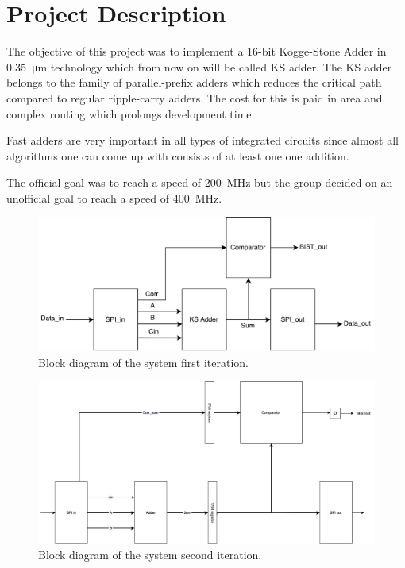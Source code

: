 \section{Project Description} \label{sec:project_description}
The objective of this project was to implement a 16-bit Kogge-Stone Adder in \SI{0.35}{\micro\m} technology which from now on will be called KS adder. The KS adder belongs to the family of parallel-prefix adders which reduces the critical path compared to regular ripple-carry adders. The cost for this is paid in area and complex routing which prolongs development time.

Fast adders are very important in all types of integrated circuits since almost all algorithms one can come up with consists of at least one one addition. 

The official goal was to reach a speed of \SI{200}{\mega\Hz} but the group decided on an unofficial goal to reach a speed of \SI{400}{\mega\Hz}.



\begin{figure}[H]
  \centering
  \captionsetup{justification=centering}
  \includegraphics[scale=0.5]{../figures/TOP.pdf}
  \caption{Block diagram of the system first iteration.} \label{fig:block_first}
\end{figure}

\begin{figure}[H]
\centering
\captionsetup{justification=centering}
\includegraphics[scale=0.175]{../figures/top_level.png}
\caption{Block diagram of the system second iteration.} \label{fig:block_second}
\end{figure}


